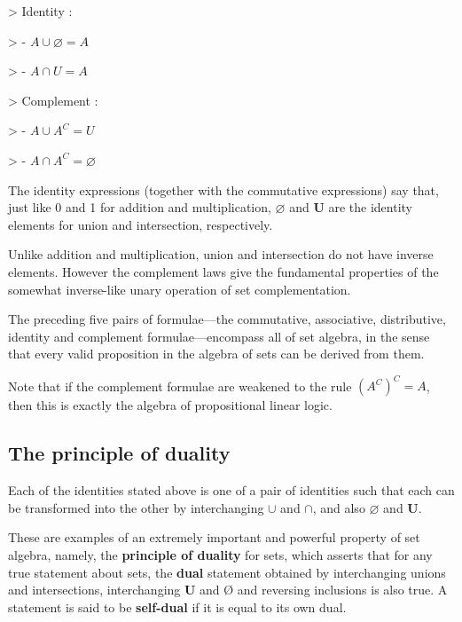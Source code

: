 > Identity :

>    - $A \cup \varnothing = A$

>    - $A \cap U = A$



> Complement :

>    - $A \cup A^C = U$

>    - $A \cap A^C = \varnothing$



The identity expressions (together with the commutative expressions) say that, just like 0
and 1 for addition and multiplication, $\varnothing$ and \textbf{U} are the identity
elements for union and intersection, respectively.



Unlike addition and multiplication, union and intersection do not have inverse elements.
However the complement laws give the fundamental properties of the somewhat inverse-like
unary operation of set complementation.



The preceding five pairs of formulae—the commutative, associative, distributive, identity
and complement formulae—encompass all of set algebra, in the sense that every valid
proposition in the algebra of sets can be derived from them.



Note that if the complement formulae are weakened to the rule $(A^C)^C = A$, then this is
exactly the algebra of propositional linear logic.




\subsection{The principle of duality}
\label{sss:thep-60d8}




Each of the identities stated above is one of a pair of identities such that each can be
transformed into the other by interchanging $\cup$ and $\cap$, and also $\varnothing$ and
\textbf{U}.



These are examples of an extremely important and powerful property of set algebra, namely,
the \textbf{principle of duality} for sets, which asserts that for any true statement
about sets, the \textbf{dual} statement obtained by interchanging unions and
intersections, interchanging \textbf{U} and Ø and reversing inclusions is also true. A
statement is said to be \textbf{self-dual} if it is equal to its own dual.




